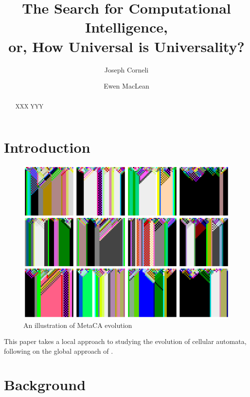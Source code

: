 \documentclass{AISB2008}
\begin{document}
\title{The Search for Computational Intelligence,\\ or, How Universal is Universality?}

\author{Joseph Corneli \and Ewen MacLean }

\maketitle


\begin{abstract}
XXX YYY
\end{abstract}

\section{Introduction}

\begin{figure}
\includegraphics[width=\columnwidth]{metaca.png}
\caption{An illustration of MetaCA evolution}
\end{figure}

This paper takes a local approach to studying the
evolution of cellular automata, following on the
global approach of \cite{pavlic2014self}.

\newpage

\section{Background}
\end{document}
